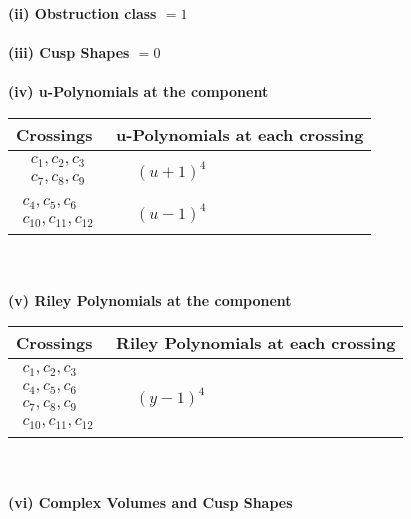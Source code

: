 \documentclass[1p]{elsarticle_modified}
\theoremstyle{definition}
\begin{document}
\flushleft \textbf{(ii) Obstruction class $= 1$}\\~\\
\flushleft \textbf{(iii) Cusp Shapes $= 0$}\\~\\
\newpage\renewcommand{\arraystretch}{1}
\flushleft \textbf{(iv) u-Polynomials at the component}\newline \\
\begin{tabular}{m{50pt}|m{274pt}}
Crossings & \hspace{64pt}u-Polynomials at each crossing \\
\hline $$\begin{aligned}c_{1},c_{2},c_{3}\\c_{7},c_{8},c_{9}\end{aligned}$$&$\begin{aligned}
&(u+1)^4
\end{aligned}$\\
\hline $$\begin{aligned}c_{4},c_{5},c_{6}\\c_{10},c_{11},c_{12}\end{aligned}$$&$\begin{aligned}
&(u-1)^4
\end{aligned}$\\
\hline
\end{tabular}\\~\\
\newpage\renewcommand{\arraystretch}{1}
\flushleft \textbf{(v) Riley Polynomials at the component}\newline \\
\begin{tabular}{m{50pt}|m{274pt}}
Crossings & \hspace{64pt}Riley Polynomials at each crossing \\
\hline $$\begin{aligned}c_{1},c_{2},c_{3}\\c_{4},c_{5},c_{6}\\c_{7},c_{8},c_{9}\\c_{10},c_{11},c_{12}\end{aligned}$$&$\begin{aligned}
&(y-1)^4
\end{aligned}$\\
\hline
\end{tabular}\\~\\
\newpage\flushleft \textbf{(vi) Complex Volumes and Cusp Shapes}
\end{document}
